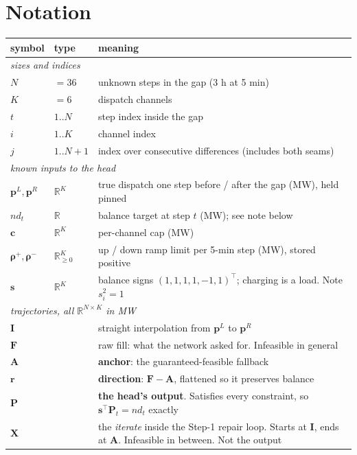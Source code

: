 \documentclass[11pt]{article}
\begin{document}
\section{Notation}

\begin{center}
\begin{tabular}{llp{7.6cm}}
\toprule
symbol & type & meaning \\
\midrule
\multicolumn{3}{l}{\emph{sizes and indices}}\\
$N$ & $=36$ & unknown steps in the gap (3 h at 5 min) \\
$K$ & $=6$ & dispatch channels \\
$t$ & $1..N$ & step index inside the gap \\
$i$ & $1..K$ & channel index \\
$j$ & $1..N{+}1$ & index over consecutive differences (includes both seams) \\
\midrule
\multicolumn{3}{l}{\emph{known inputs to the head}}\\
$\mathbf{p}^{L},\mathbf{p}^{R}$ & $\mathbb{R}^{K}$ & true dispatch one step before / after the gap (MW), held pinned \\
$nd_t$ & $\mathbb{R}$ & balance target at step $t$ (MW); see note below \\
$\mathbf{c}$ & $\mathbb{R}^{K}$ & per-channel cap (MW) \\
$\bm{\rho}^{+},\bm{\rho}^{-}$ & $\mathbb{R}^{K}_{\ge0}$ & up / down ramp limit per 5-min step (MW), stored positive \\
$\mathbf{s}$ & $\mathbb{R}^{K}$ & balance signs $(1,1,1,1,-1,1)^{\!\top}$; charging is a load. Note $s_i^2=1$ \\
\midrule
\multicolumn{3}{l}{\emph{trajectories, all $\mathbb{R}^{N\times K}$ in MW}}\\
$\mathbf{I}$ & & straight interpolation from $\mathbf{p}^{L}$ to $\mathbf{p}^{R}$ \\
$\mathbf{F}$ & & raw fill: what the network asked for. Infeasible in general \\
$\mathbf{A}$ & & \textbf{anchor}: the guaranteed-feasible fallback \\
$\mathbf{r}$ & & \textbf{direction}: $\mathbf{F}-\mathbf{A}$, flattened so it preserves balance \\
$\mathbf{P}$ & & \textbf{the head's output}. Satisfies every constraint, so $\mathbf{s}^{\!\top}\mathbf{P}_t=nd_t$ exactly \\
$\mathbf{X}$ & & the \emph{iterate} inside the Step-1 repair loop. Starts at $\mathbf{I}$, ends at $\mathbf{A}$. Infeasible in between. Not the output \\

\end{tabular}
\end{center}
\end{document}
